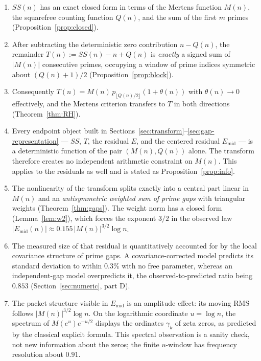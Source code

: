 \documentclass[11pt]{amsart}
\numberwithin{equation}{section}
\theoremstyle{plain}
\theoremstyle{definition}
\theoremstyle{remark}
\newcommand{\Mert}{M}
\newcommand{\Sq}{Q}
\begin{document}
\begin{enumerate}[label=(\roman*)]
\item $SS(n)$ has an exact closed form in terms of the Mertens function
$\Mert(n)$, the squarefree counting function $\Sq(n)$, and the sum of the first
$m$ primes (Proposition~\ref{prop:closed}).
\item After subtracting the deterministic zero contribution $n-\Sq(n)$, the
remainder $T(n):=SS(n)-n+\Sq(n)$ is \emph{exactly} a signed sum of $|\Mert(n)|$
consecutive primes, occupying a window of prime indices symmetric about
$(\Sq(n)+1)/2$ (Proposition~\ref{prop:block}).
\item Consequently $T(n)=\Mert(n)\,p_{\lfloor \Sq(n)/2\rfloor}(1+\theta(n))$
with $\theta(n)\to0$ effectively, and the Mertens criterion transfers to $T$ in
both directions (Theorem~\ref{thm:RH}).
\item Every endpoint object built in Sections~\ref{sec:transform}--\ref{sec:gap-representation} --- $SS$, $T$, the residual $E$, and the centered
residual $E_{\mathrm{mid}}$ --- is a deterministic function of the pair
$(\Mert(n),\Sq(n))$ alone. The transform therefore creates no independent
arithmetic constraint on $\Mert(n)$. This applies to the residuals as well and
is stated as Proposition~\ref{prop:info}.
\item The nonlinearity of the transform splits exactly into a central part
linear in $\Mert(n)$ and an \emph{antisymmetric weighted sum of prime gaps}
with triangular weights (Theorem~\ref{thm:gaps}). The weight norm has a closed
form (Lemma~\ref{lem:w2}), which forces the exponent $3/2$ in the observed law
$|E_{\mathrm{mid}}(n)|\approx0.155\,|\Mert(n)|^{3/2}\log n$.
\item The measured size of that residual is quantitatively accounted for by the
local covariance structure of prime gaps. A covariance-corrected model predicts
its standard deviation to within $0.3\%$ with no free parameter, whereas an
independent-gap model overpredicts it, the observed-to-predicted ratio being
$0.853$
(Section~\ref{sec:numeric}, part D).
\item The packet structure visible in $E_{\mathrm{mid}}$ is an amplitude effect:
its moving RMS follows $|M(n)|^{3/2}\log n$. On the logarithmic coordinate
$u=\log n$, the spectrum of $M(e^u)e^{-u/2}$ displays the ordinates $\gamma_k$
of zeta zeros, as predicted by the classical explicit formula. This spectral
observation is a sanity check, not new information about the zeros; the finite
$u$-window has frequency resolution about $0.91$.

\end{enumerate}
\end{document}
